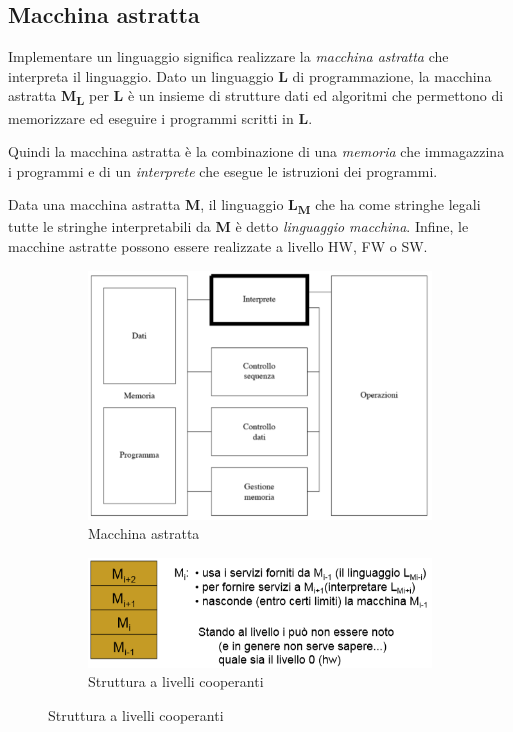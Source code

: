\documentclass[a4paper,oneside,titlepage]{book}
\begin{document}
\subsection{Macchina astratta}
Implementare un linguaggio significa realizzare la \textit{macchina astratta} che interpreta il linguaggio. Dato un linguaggio \textbf{L} di programmazione, la macchina astratta \textbf{M\textsubscript{L}} per \textbf{L} è un insieme di strutture dati ed algoritmi che permettono di memorizzare ed eseguire i programmi scritti in \textbf{L}.

Quindi la macchina astratta è la combinazione di una \textit{memoria} che immagazzina i programmi e di un \textit{interprete} che esegue le istruzioni dei programmi.

Data una macchina astratta \textbf{M}, il linguaggio \textbf{L\textsubscript{M}} che ha come stringhe legali tutte le stringhe interpretabili da \textbf{M} è detto \textit{linguaggio macchina}. Infine, le macchine astratte possono essere realizzate a livello HW, FW o SW.
\begin{figure}[htp]
	\begin{subfigure}{0.49\textwidth}
		\includegraphics[width=\textwidth, height=\textheight, keepaspectratio]{ma1.png} 
		\caption{Macchina astratta}
	\end{subfigure}
	\hfill
	\begin{subfigure}{0.49\textwidth}
		\includegraphics[width=\textwidth, height=\textheight, keepaspectratio]{ma2.png}
		\caption{Struttura a livelli cooperanti}
	\end{subfigure}
\end{figure}
\end{document}

